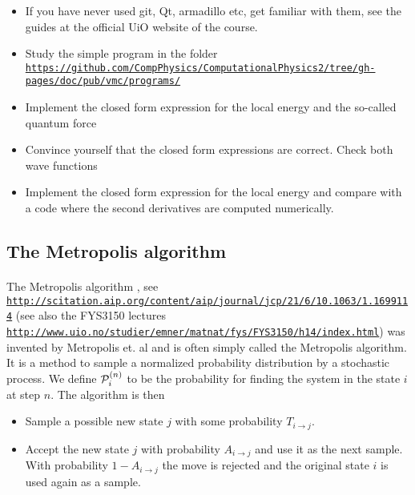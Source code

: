 \documentclass[%
twoside,                 %
final,                   %
10pt]{article}
\begin{document}
\begin{itemize}
 \item If you have never used git, Qt, armadillo etc, get familiar with them, see the guides at the official UiO website of the course.

 \item Study the simple program in the folder \href{{https://github.com/CompPhysics/ComputationalPhysics2/tree/gh-pages/doc/pub/vmc/programs/}}{\nolinkurl{https://github.com/CompPhysics/ComputationalPhysics2/tree/gh-pages/doc/pub/vmc/programs/}}

 \item Implement the closed form expression for the local energy and the so-called quantum force

 \item Convince yourself that the closed form expressions are correct. Check both wave functions

 \item Implement the closed form expression for the local energy and compare with a code where the second derivatives are computed numerically.
\end{itemize}

\noindent




\subsection*{The Metropolis algorithm}

\paragraph{}
The Metropolis algorithm , see \href{{http://scitation.aip.org/content/aip/journal/jcp/21/6/10.1063/1.1699114}}{\nolinkurl{http://scitation.aip.org/content/aip/journal/jcp/21/6/10.1063/1.1699114}}  (see also the FYS3150 lectures \href{{http://www.uio.no/studier/emner/matnat/fys/FYS3150/h14/index.html}}{\nolinkurl{http://www.uio.no/studier/emner/matnat/fys/FYS3150/h14/index.html}})
was invented by Metropolis et. al
and is often simply called the Metropolis algorithm.
It is a method to sample a normalized probability
distribution by a stochastic process. We define ${\cal P}_i^{(n)}$ to
be the probability for finding the system in the state $i$ at step $n$.
The algorithm is then

\begin{itemize}
\item Sample a possible new state $j$ with some probability $T_{i\rightarrow j}$.

\item Accept the new state $j$ with probability $A_{i \rightarrow j}$ and use it as the next sample. With probability $1-A_{i\rightarrow j}$ the move is rejected and the original state $i$ is used again as a sample.
\end{itemize}
\end{document}
